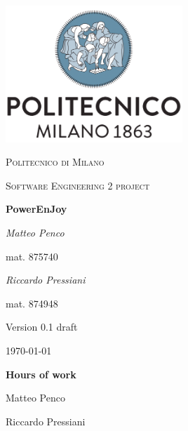 \documentclass{report}
\begin{document}
\begin{titlepage}
	\centering
	\includegraphics[width=0.5\textwidth]{polimi-logo}\par\vspace{1cm}
	{\scshape\LARGE Politecnico di Milano\par}
	\vspace{1cm}
	{\scshape\Large Software Engineering 2 project\par}
	\vspace{1.5cm}
	{\huge\bfseries PowerEnJoy\par}
	\vspace{2cm}
	\begin{multicols}{2}
		{\Large\itshape Matteo Penco\par}
		\vspace{0.25cm}
		mat. 875740
		\vfill\columnbreak
		{\Large\itshape Riccardo Pressiani\par}
		\vspace{0.25cm}
		mat. 874948
	\end{multicols}
	
	\vfill
	
	{\Large Version 0.1 draft\par}
	\vspace{1.25cm}
	{\large \today\par}
\end{titlepage}

\begin{versionhistory}
\end{versionhistory}

\vspace{5cm}
{\noindent\Huge\bfseries Hours of work\par}
\vspace{0.5cm}
{\noindent Matteo Penco	\par}
{\noindent Riccardo Pressiani \par}

\tableofcontents





\begin{appendices}
	
	
\end{appendices}

\listoffigures
\begingroup
\let\clearpage\relax
\endgroup



\end{document}
